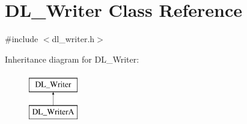 \hypertarget{classDL__Writer}{\section{D\-L\-\_\-\-Writer Class Reference}
\label{classDL__Writer}
}


{\ttfamily \#include $<$dl\-\_\-writer.\-h$>$}

Inheritance diagram for D\-L\-\_\-\-Writer\-:\begin{figure}[H]
\begin{center}
\leavevmode
\includegraphics[height=2.000000cm]{classDL__Writer}
\end{center}
\end{figure}
